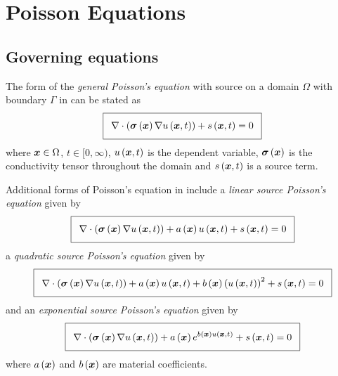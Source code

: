 \section{Poisson Equations} 

\subsection{Governing equations}

The form of the \emph{general Poisson's equation} with source on a domain $\Omega$ with boundary
$\Gamma$ in \OpenCMISS can be stated as
\begin{equation}
  \addtolength{\fboxsep}{5pt}
  \boxed{
    \divergence{}{\pbrac{\fnof{\tensor{\sigma}}{\vectr{x}}\gradient{}{\fnof{u}{\vectr{x},t}}}}+
    \fnof{s}{\vectr{x},t}=0
  }
  \label{eqn:GeneralPoissonEquation}
\end{equation}
where $ \boldsymbol{x} \in\Omega$, $t\in[0,\infty)$, $ u\left(  \boldsymbol{x} ,t \right) $ is the dependent variable, 
$ \boldsymbol{\mathit{\sigma}}\left(  \boldsymbol{x}  \right) $ is the conductivity tensor throughout 
the domain and $ s\left(  \boldsymbol{x} ,t \right) $ is a source term.

Additional forms of Poisson's equation in \OpenCMISS include a \emph{linear
  source Poisson's equation} given by
\begin{equation}
  \addtolength{\fboxsep}{5pt}
  \boxed{
    \divergence{}{\pbrac{\fnof{\tensor{\sigma}}{\vectr{x}}\gradient{}{\fnof{u}{\vectr{x},t}}}}+
    \fnof{a}{\vectr{x}}\fnof{u}{\vectr{x},t}+\fnof{s}{\vectr{x},t}=0
  }
  \label{eqn:LinearSourcePoissonEquation}
\end{equation}
a \emph{quadratic source Poisson's equation} given by
\begin{equation}
  \addtolength{\fboxsep}{5pt}
  \boxed{
    \divergence{}{\pbrac{\fnof{\tensor{\sigma}}{\vectr{x}}\gradient{}{\fnof{u}{\vectr{x},t}}}}+
    \fnof{a}{\vectr{x}}\fnof{u}{\vectr{x},t}+\fnof{b}{\vectr{x}}\pbrac{\fnof{u}{\vectr{x},t}}^{2}+\fnof{s}{\vectr{x},t}=0
  }
  \label{eqn:QuadraticSourcePoissonEquation}
\end{equation}
and an \emph{exponential source Poisson's equation} given by
\begin{equation}
  \addtolength{\fboxsep}{5pt}
  \boxed{
    \divergence{}{\pbrac{\fnof{\tensor{\sigma}}{\vectr{x}}\gradient{}{\fnof{u}{\vectr{x},t}}}}+
    \fnof{a}{\vectr{x}}e^{\fnof{b}{\vectr{x}}\fnof{u}{\vectr{x},t}}+\fnof{s}{\vectr{x},t}=0
  }
  \label{eqn:ExponentialSourcePoissonEquation}
\end{equation}
where $ a\left(  \boldsymbol{x}  \right) $ and $ b\left(  \boldsymbol{x}  \right) $ are material coefficients.

